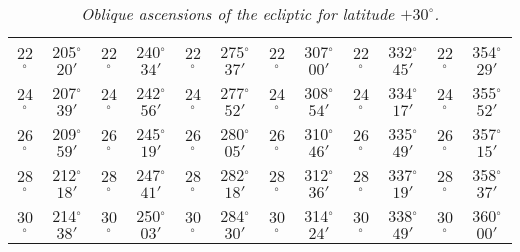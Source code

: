 \begin{table}
{\begin{tabular}{cc|cc|cc|cc|cc|cc}
22$^\circ$ & 205$^\circ$$20'$ & 22$^\circ$ & 240$^\circ$$34'$ & 22$^\circ$ & 275$^\circ$$37'$ & 22$^\circ$ & 307$^\circ$$00'$ &  22$^\circ$ & 332$^\circ$$45'$ & 22$^\circ$ & 354$^\circ$$29'$\\
24$^\circ$ & 207$^\circ$$39'$ & 24$^\circ$ & 242$^\circ$$56'$ & 24$^\circ$ & 277$^\circ$$52'$ & 24$^\circ$ & 308$^\circ$$54'$ &  24$^\circ$ & 334$^\circ$$17'$ & 24$^\circ$ & 355$^\circ$$52'$\\
26$^\circ$ & 209$^\circ$$59'$ & 26$^\circ$ & 245$^\circ$$19'$ & 26$^\circ$ & 280$^\circ$$05'$ & 26$^\circ$ & 310$^\circ$$46'$ &  26$^\circ$ & 335$^\circ$$49'$ & 26$^\circ$ & 357$^\circ$$15'$\\
28$^\circ$ & 212$^\circ$$18'$ & 28$^\circ$ & 247$^\circ$$41'$ & 28$^\circ$ & 282$^\circ$$18'$ & 28$^\circ$ & 312$^\circ$$36'$ &  28$^\circ$ & 337$^\circ$$19'$ & 28$^\circ$ & 358$^\circ$$37'$\\
30$^\circ$ & 214$^\circ$$38'$ & 30$^\circ$ & 250$^\circ$$03'$ & 30$^\circ$ & 284$^\circ$$30'$ & 30$^\circ$ & 314$^\circ$$24'$ &  30$^\circ$ & 338$^\circ$$49'$ & 30$^\circ$ & 360$^\circ$$00'$\\
\end{tabular}}
\caption{\em Oblique ascensions of the ecliptic for latitude $+30^\circ$.}\label{tz}
\end{table}


